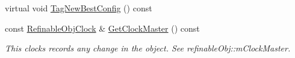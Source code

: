 \begin{DoxyCompactItemize}
virtual void \mbox{\hyperlink{class_obj_cryst_1_1_refinable_obj_a8961de41ffb5a91f2850cb4cb0160072}{Tag\+New\+Best\+Config}} () const
\item 
\mbox{\label{class_obj_cryst_1_1_refinable_obj_a86893e29a886c359d977f964d3bf0602}} 
const \mbox{\hyperlink{class_obj_cryst_1_1_refinable_obj_clock}{Refinable\+Obj\+Clock}} \& \mbox{\hyperlink{class_obj_cryst_1_1_refinable_obj_a86893e29a886c359d977f964d3bf0602}{Get\+Clock\+Master}} () const
\begin{DoxyCompactList}\small\item\em This clocks records {\itshape any} change in the object. See refinable\+Obj\+::m\+Clock\+Master. \end{DoxyCompactList}\end{DoxyCompactItemize}
